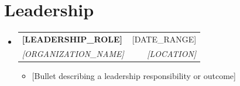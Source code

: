 \documentclass[letterpaper,10pt]{article}
\makeatletter
\newcommand{\resumeItem}[1]{
  \item\small{
    {#1 \vspace{-2pt}}
  }
}
\newcommand{\resumeSubheading}[4]{
  \vspace{-2pt}\item
    \begin{tabular*}{0.97\textwidth}[t]{l@{\extracolsep{\fill}}r}
      \textbf{#1} & #2 \\
      \textit{\small#3} & \textit{\small #4} \\
    \end{tabular*}\vspace{-7pt}
}
\newcommand{\resumeSubHeadingListStart}{\begin{itemize}[leftmargin=0.15in, label={}]}
\newcommand{\resumeSubHeadingListEnd}{\end{itemize}}
\newcommand{\resumeItemListStart}{\begin{itemize}}
\newcommand{\resumeItemListEnd}{\end{itemize}\vspace{-5pt}}
\makeatother
\begin{document}
\section{Leadership}
  \resumeSubHeadingListStart
    \resumeSubheading
      {[LEADERSHIP_ROLE]}{[DATE_RANGE]}
      {[ORGANIZATION_NAME]}{[LOCATION]}
      \resumeItemListStart
        \resumeItem{[Bullet describing a leadership responsibility or outcome]}
      \resumeItemListEnd
  \resumeSubHeadingListEnd


\end{document}
